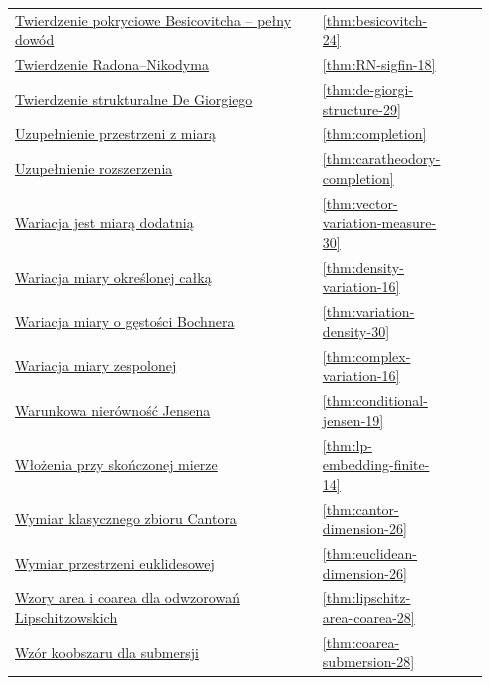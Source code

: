 \documentclass[11pt,a4paper,oneside]{book}
\numberwithin{equation}{chapter}
\theoremstyle{plain}
\theoremstyle{definition}
\theoremstyle{remark}
\begin{document}
\begin{longtable}{@{}p{0.72\linewidth}p{0.135\linewidth}p{0.08\linewidth}@{}}
\hyperref[thm:besicovitch-24]{Twierdzenie pokryciowe Besicovitcha -- pełny dowód} & \ref*{thm:besicovitch-24} & \pageref*{thm:besicovitch-24} \\
\hyperref[thm:RN-sigfin-18]{Twierdzenie Radona--Nikodyma} & \ref*{thm:RN-sigfin-18} & \pageref*{thm:RN-sigfin-18} \\
\hyperref[thm:de-giorgi-structure-29]{Twierdzenie strukturalne De Giorgiego} & \ref*{thm:de-giorgi-structure-29} & \pageref*{thm:de-giorgi-structure-29} \\
\hyperref[thm:completion]{Uzupełnienie przestrzeni z miarą} & \ref*{thm:completion} & \pageref*{thm:completion} \\
\hyperref[thm:caratheodory-completion]{Uzupełnienie rozszerzenia} & \ref*{thm:caratheodory-completion} & \pageref*{thm:caratheodory-completion} \\
\hyperref[thm:vector-variation-measure-30]{Wariacja jest miarą dodatnią} & \ref*{thm:vector-variation-measure-30} & \pageref*{thm:vector-variation-measure-30} \\
\hyperref[thm:density-variation-16]{Wariacja miary określonej całką} & \ref*{thm:density-variation-16} & \pageref*{thm:density-variation-16} \\
\hyperref[thm:variation-density-30]{Wariacja miary o gęstości Bochnera} & \ref*{thm:variation-density-30} & \pageref*{thm:variation-density-30} \\
\hyperref[thm:complex-variation-16]{Wariacja miary zespolonej} & \ref*{thm:complex-variation-16} & \pageref*{thm:complex-variation-16} \\
\hyperref[thm:conditional-jensen-19]{Warunkowa nierówność Jensena} & \ref*{thm:conditional-jensen-19} & \pageref*{thm:conditional-jensen-19} \\
\hyperref[thm:lp-embedding-finite-14]{Włożenia przy skończonej mierze} & \ref*{thm:lp-embedding-finite-14} & \pageref*{thm:lp-embedding-finite-14} \\
\hyperref[thm:cantor-dimension-26]{Wymiar klasycznego zbioru Cantora} & \ref*{thm:cantor-dimension-26} & \pageref*{thm:cantor-dimension-26} \\
\hyperref[thm:euclidean-dimension-26]{Wymiar przestrzeni euklidesowej} & \ref*{thm:euclidean-dimension-26} & \pageref*{thm:euclidean-dimension-26} \\
\hyperref[thm:lipschitz-area-coarea-28]{Wzory area i coarea dla odwzorowań Lipschitzowskich} & \ref*{thm:lipschitz-area-coarea-28} & \pageref*{thm:lipschitz-area-coarea-28} \\
\hyperref[thm:coarea-submersion-28]{Wzór koobszaru dla submersji} & \ref*{thm:coarea-submersion-28} & \pageref*{thm:coarea-submersion-28} \\

\end{longtable}
\end{document}
